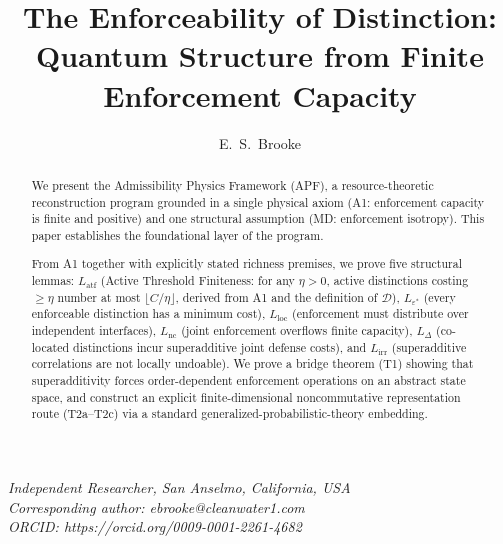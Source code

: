 \documentclass[11pt]{article}
\title{The Enforceability of Distinction: Quantum Structure from Finite Enforcement Capacity}
\author{E.\ S.\ Brooke}
\date{}
\theoremstyle{remark}
\begin{document}
\maketitle

\noindent\textit{Independent Researcher, San Anselmo, California, USA}\\
\textit{Corresponding author: ebrooke@cleanwater1.com}\\
\textit{ORCID: https://orcid.org/0009-0001-2261-4682}

\bigskip

\begin{abstract}
We present the Admissibility Physics Framework (APF), a resource-theoretic
reconstruction program grounded in a single physical axiom (A1: enforcement
capacity is finite and positive) and one structural assumption (MD: enforcement isotropy).  This paper establishes the
foundational layer of the program.

From A1 together with explicitly stated richness premises, we prove five structural lemmas:
$L_{\mathrm{atf}}$ (Active Threshold Finiteness: for any $\eta > 0$, active distinctions
costing $\ge \eta$ number at most $\lfloor C/\eta \rfloor$, derived from A1 and the
definition of $\mathcal{D}$),
$L_{\varepsilon^*}$ (every enforceable distinction has a minimum cost),
$L_{\mathrm{loc}}$ (enforcement must distribute over independent interfaces),
$L_{\mathrm{nc}}$ (joint enforcement overflows finite capacity),
$L_\Delta$ (co-located distinctions incur superadditive joint defense costs),
and $L_{\mathrm{irr}}$ (superadditive correlations are not locally undoable).
We prove a bridge theorem (T1) showing that superadditivity forces
order-dependent enforcement operations on an abstract state space, and
construct an explicit finite-dimensional noncommutative representation route
(T2a--T2c) via a standard generalized-probabilistic-theory embedding.


\end{abstract}
\end{document}
